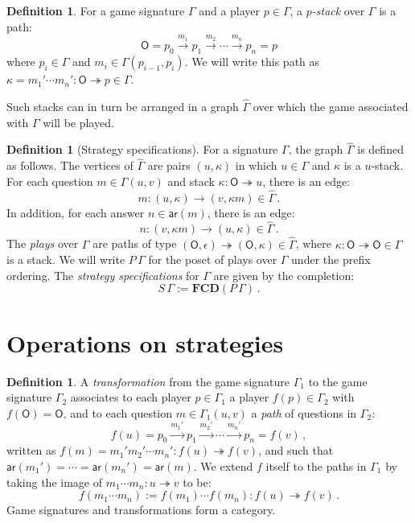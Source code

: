 \documentclass[11pt,oneside,draft]{book}
\theoremstyle{definition}
\newtheorem{definition}[theorem]{Definition}
\newcommand{\kw}[1]{\ensuremath{ \mathsf{#1} }}
\begin{document}
\begin{definition}
For a game signature $\Gamma$ and a player $p \in \Gamma$,
a \emph{$p$-stack} over $\Gamma$ is a path:
\[
  \kw{O} = p_0 \xrightarrow{m_1} p_1 \xrightarrow{m_2} \cdots
             \xrightarrow{m_n} p_n = p
\]
where $p_i \in \Gamma$ and $m_i \in \Gamma(p_{i-1}, p_i)$.
We will write this path as
$\kappa = m_1' \cdots m_n' : \kw{O} \twoheadrightarrow p 
 \in \Gamma$.
\end{definition}

Such stacks can in turn be arranged in a graph $\hat{\Gamma}$
over which the game associated with $\Gamma$ will be played.

\begin{definition}[Strategy specifications] %
For a signature $\Gamma$,
the graph $\hat{\Gamma}$ is defined as follows.
The vertices of $\hat{\Gamma}$ are pairs $(u, \kappa)$
in which $u \in \Gamma$ and $\kappa$ is a $u$-stack.
For each question $m \in \Gamma(u,v)$
and stack $\kappa : \kw{O} \twoheadrightarrow u$,
there is an edge:
\[
    m : (u, \kappa) \rightarrow (v, \kappa m) \in \hat{\Gamma} \,.
\]
In addition, for each answer $n \in \kw{ar}(m)$,
there is an edge:
\[
    n : (v, \kappa m) \rightarrow (u, \kappa) \in \hat{\Gamma} \,.
\]
The \emph{plays} over $\Gamma$
are paths of type
$(\kw{O}, \epsilon) \twoheadrightarrow (\kw{O}, \kappa)
 \in \hat{\Gamma}$,
where $\kappa : \kw{O} \twoheadrightarrow \kw{O} \in \Gamma$
is a stack.
We will write
$P \, \Gamma$
for the poset of plays over $\Gamma$
under the prefix ordering.
The \emph{strategy specifications} for $\Gamma$
are given by the completion:
\[
    S \, \Gamma := \mathbf{FCD}(P \, \Gamma) \,.
\]
\end{definition}


\section{Operations on strategies} %

\begin{definition}
A \emph{transformation}
from the game signature $\Gamma_1$
to the game signature $\Gamma_2$
associates to each player $p \in \Gamma_1$ a player $f(p) \in \Gamma_2$
with $f(\kw{O}) = \kw{O}$,
and to each question $m \in \Gamma_1(u,v)$
a \emph{path} of questions in $\Gamma_2$:
\[
  f(u) = p_0 \xrightarrow{m_1'} p_1 \xrightarrow{m_2'} \cdots
             \xrightarrow{m_n'} p_n = f(v) \,,
\]
written as
$f(m) = m_1' m_2' \cdots m_n' : f(u) \twoheadrightarrow f(v)$, and
such that
$\kw{ar}(m_1') = \cdots = \kw{ar}(m_n') = \kw{ar}(m)$.
We extend $f$ itself to the paths in $\Gamma_1$
by taking the image of $m_1 \cdots m_n : u \twoheadrightarrow v$
to be:
\[
  f(m_1 \cdots m_n) := f(m_1) \cdots f(m_n) :
    f(u) \twoheadrightarrow f(v) \,.
\]
Game signatures and transformations form a category.
\end{definition}
\end{document}
